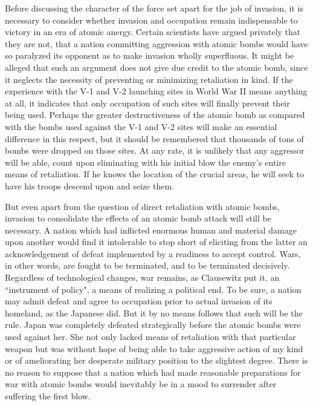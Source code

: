 Before discussing the character of the force set apart for the job of invasion, it is necessary to consider whether invasion and occupation remain indispensable to victory in an era of atomic anergy. Certain scientists have argued privately that they are not, that a nation committing aggression with atomic bombs would have so paralyzed its opponent as to make invasion wholly superfluous. It might be alleged that such an argument does not give due credit to the atomic bomb, since it neglects the necessity of preventing or minimizing retaliation in kind. If the experience with the V-1 and V-2 launching sites in World War II means anything at all, it indicates that only occupation of such sites will finally prevent their being used. Perhaps the greater destructiveness of the atomic bomb as compared with the bombs used against the V-1 and V-2 sites will make an essential difference in this respect, but it should be remembered that thousands of tons of bombs were dropped on those sites. At any rate, it is unlikely that any aggressor will be able, count upon eliminating with his initial blow the enemy's entire means of retaliation. If he knows the location of the crucial areas, he will seek to have his troops descend upon and seize them.

But even apart from the question of direct retaliation with atomic bombs, invasion to consolidate the effects of an atomic bomb attack will still be necessary. A nation which had inflicted enormous human and material damage upon another would find it intolerable to stop short of eliciting from the latter an acknowledgement of defeat implemented by a readiness to accept control. Wars, in other words, are fought to be terminated, and to be terminated decisively. Regardless of technological changes, war remains, as Clausewitz put it, an ``instrument of policy", a means of realizing a political end. To be sure, a nation may admit defeat and agree to occupation prior to actual invasion of its homeland, as the Japanese did. But it by no means follows that such will be the rule. Japan was completely defeated strategically before the atomic bombs were used against her. She not only lacked means of retaliation with that particular weapon but was without hope of being able to take aggressive action of my kind or of ameliorating her desperate military position to the slightest degree. There is no reason to suppose that a nation which had made reasonable preparations for war with atomic bombs would inevitably be in a mood to surrender after suffering the first blow.


